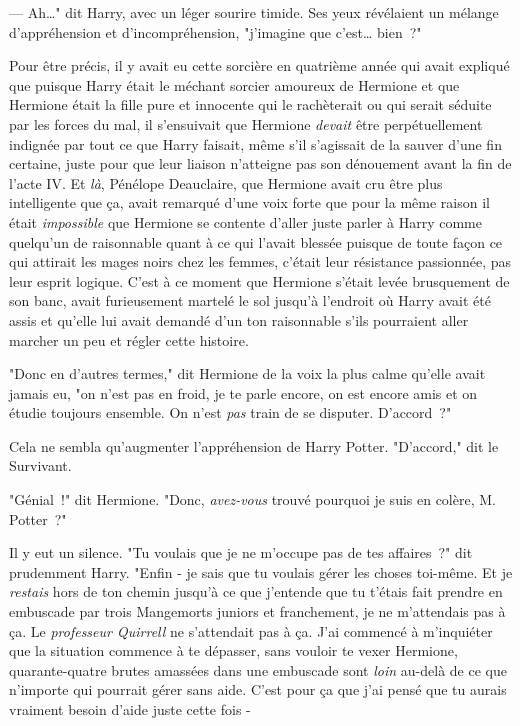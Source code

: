 --- Ah…" dit Harry, avec un léger sourire timide. Ses yeux révélaient un mélange d'appréhension et d'incompréhension, "j'imagine que c'est… bien~?"

Pour être précis, il y avait eu cette sorcière en quatrième année qui avait expliqué que puisque Harry était le méchant sorcier amoureux de Hermione et que Hermione était la fille pure et innocente qui le rachèterait ou qui serait séduite par les forces du mal, il s'ensuivait que Hermione \emph{devait} être perpétuellement indignée par tout ce que Harry faisait, même s'il s'agissait de la sauver d'une fin certaine, juste pour que leur liaison n'atteigne pas son dénouement avant la fin de l'acte IV. Et \emph{là}, Pénélope Deauclaire, que Hermione avait cru être plus intelligente que ça, avait remarqué d'une voix forte que pour la même raison il était \emph{impossible} que Hermione se contente d'aller juste parler à Harry comme quelqu'un de raisonnable quant à ce qui l'avait blessée puisque de toute façon ce qui attirait les mages noirs chez les femmes, c'était leur résistance passionnée, pas leur esprit logique. C'est à ce moment que Hermione s'était levée brusquement de son banc, avait furieusement martelé le sol jusqu'à l'endroit où Harry avait été assis et qu'elle lui avait demandé d'un ton raisonnable s'ils pourraient aller marcher un peu et régler cette histoire.

"Donc en d'autres termes," dit Hermione de la voix la plus calme qu'elle avait jamais eu, "on n'est pas en froid, je te parle encore, on est encore amis et on étudie toujours ensemble. On n'est \emph{pas} train de se disputer. D'accord~?"

Cela ne sembla qu'augmenter l'appréhension de Harry Potter. "D'accord," dit le Survivant.

"Génial~!" dit Hermione. "Donc, \emph{avez-vous} trouvé pourquoi je suis en colère, M. Potter~?"

Il y eut un silence. "Tu voulais que je ne m'occupe pas de tes affaires~?" dit prudemment Harry. "Enfin - je sais que tu voulais gérer les choses toi-même. Et je \emph{restais} hors de ton chemin jusqu'à ce que j'entende que tu t'étais fait prendre en embuscade par trois Mangemorts juniors et franchement, je ne m'attendais pas à ça. Le \emph{professeur Quirrell} ne s'attendait pas à ça. J'ai commencé à m'inquiéter que la situation commence à te dépasser, sans vouloir te vexer Hermione, quarante-quatre brutes amassées dans une embuscade sont \emph{loin} au-delà de ce que n'importe qui pourrait gérer sans aide. C'est pour ça que j'ai pensé que tu aurais vraiment besoin d'aide juste cette fois -

